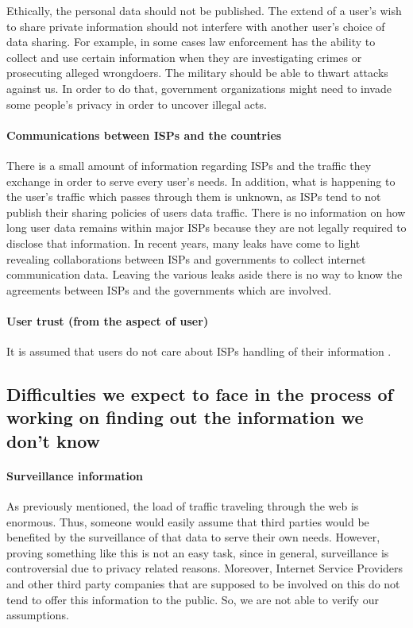 Ethically, the personal data should not be published. The extend of a user's 
wish to share private information should not interfere with another user's 
choice of data sharing. For example, in some cases law enforcement has the 
ability to collect and use certain information when they are investigating 
crimes or prosecuting alleged wrongdoers. The military  should  be able to 
thwart attacks against us. In order to do that, government organizations might 
need to invade some people's privacy in order to uncover illegal acts. 


\paragraph{Communications between ISPs and the countries}

There is a small amount of information regarding ISPs and the traffic they 
exchange in order to serve every user's needs. In addition, what is happening to
the user's traffic which passes through them is unknown, as ISPs tend to not 
publish their sharing policies of users data traffic. There is no information on 
how long user data remains within major ISPs because they are not legally 
required to disclose that information. In recent years, many leaks have come to 
light revealing collaborations between ISPs and governments to collect internet 
communication data. Leaving the various leaks aside there is no way to know the 
agreements between ISPs and the governments which are involved. 

\paragraph{User trust (from the aspect of user)}
It is assumed that users do not care about ISPs handling of their information 
\cite{isp1, isp2}.

\subsection{Difficulties we expect to face in the process of working on finding 
out the information we don't know} 

\paragraph{Surveillance information}
As previously mentioned, the load of traffic traveling through the web is 
enormous. Thus, someone would easily assume that third parties would be 
benefited by the surveillance of that data to serve their own needs. However, 
proving something like this is not an easy task, since in general, surveillance 
is controversial due to privacy related reasons. Moreover, Internet Service 
Providers and other third party companies that are supposed to be involved on 
this do not tend to offer this information to the public. So, we are not able to 
verify our assumptions.  

